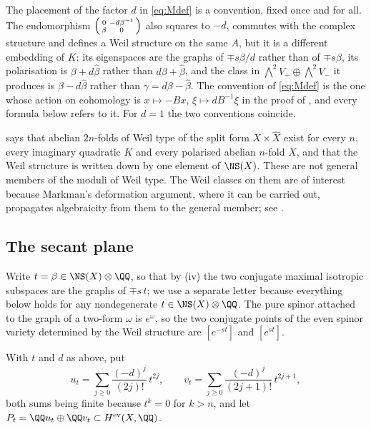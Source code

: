 The placement of the factor $d$ in \eqref{eq:Mdef} is a convention, fixed once
and for all. The endomorphism $\begin{psmallmatrix}0&-d\beta^{-1}\\
\beta&0\end{psmallmatrix}$ also squares to $-d$, commutes with the complex
structure and defines a Weil structure on the same $A$, but it is a different
embedding of $K$: its eigenspaces are the graphs of $\mp s\beta/d$ rather
than of $\mp s\beta$, its polarisation is $\beta+d\widehat\beta$ rather than
$d\beta+\widehat\beta$, and the class in
$\bigwedge^{2}V_{+}\oplus\bigwedge^{2}V_{-}$ it produces is
$\beta-d\widehat\beta$ rather than $\gamma=d\beta-\widehat\beta$. The
convention of \eqref{eq:Mdef} is the one whose action on cohomology is
$x\mapsto-Bx$, $\xi\mapsto dB^{-1}\xi$ in the proof of
, and every formula below refers to it. For $d=1$ the
two conventions coincide.

\begin{remark}\label{rem:abundant}
 says that abelian $2n$-folds of Weil type of the split
form $X\times\widehat{X}$ exist for every $n$, every imaginary quadratic $K$
and every polarised abelian $n$-fold $X$, and that the Weil structure is
written down by one element of $\NS(X)$. These are not general members of the
moduli of Weil type. The Weil classes on them are of interest because
Markman's deformation argument, where it can be carried out, propagates
algebraicity from them to the general member; see .
\end{remark}

\subsection{The secant plane}

Write $t=\beta\in\NS(X)\otimes\QQ$, so that by
(iv) the two conjugate maximal isotropic subspaces are
the graphs of $\mp s\,t$; we use a separate letter because everything below
holds for any nondegenerate $t\in\NS(X)\otimes\QQ$. The pure spinor
attached to the graph of a two-form $\omega$ is $e^{\omega}$, so the two
conjugate points of the even spinor variety determined by the Weil structure
are $[e^{-st}]$ and $[e^{st}]$.

\begin{definition}\label{def:secantplane}
With $t$ and $d$ as above, put
\begin{equation}\label{eq:uv}
  u_{t}=\sum_{j\ge0}\frac{(-d)^{j}}{(2j)!}\,t^{2j},
  \qquad
  v_{t}=\sum_{j\ge0}\frac{(-d)^{j}}{(2j+1)!}\,t^{2j+1},
\end{equation}
both sums being finite because $t^{k}=0$ for $k>n$, and let
$P_{t}=\QQ u_{t}\oplus\QQ v_{t}\subset H^{\mathrm{ev}}(X,\QQ)$.
\end{definition}

